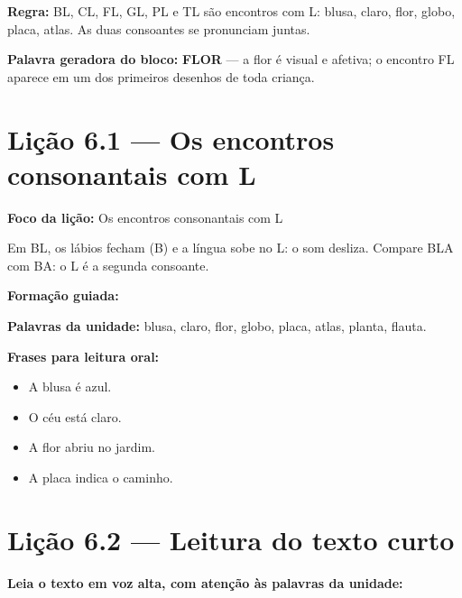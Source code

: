 \textbf{Regra:} BL, CL, FL, GL, PL e TL são encontros com L: blusa, claro, flor, globo, placa, atlas. As duas consoantes se pronunciam juntas.

\textbf{Palavra geradora do bloco:} \textbf{FLOR} --- a flor é visual e afetiva; o encontro FL aparece em um dos primeiros desenhos de toda criança.

\section{Lição 6.1 --- Os encontros consonantais com L}

\textbf{Foco da lição:} Os encontros consonantais com L


\begin{boquinha}
Em BL, os lábios fecham (B) e a língua sobe no L: o som desliza. Compare BLA com BA: o L é a segunda consoante.
\end{boquinha}

\noindent\textbf{Formação guiada:}

\begin{center}
\end{center}

\noindent\textbf{Palavras da unidade:} blusa, claro, flor, globo, placa, atlas, planta, flauta.

\noindent\textbf{Frases para leitura oral:}
\begin{itemize}[leftmargin=1.6em]
  \item A blusa é azul.
  \item O céu está claro.
  \item A flor abriu no jardim.
  \item A placa indica o caminho.
\end{itemize}

\section{Lição 6.2 --- Leitura do texto curto}

\noindent\textbf{Leia o texto em voz alta, com atenção às palavras da unidade:}


